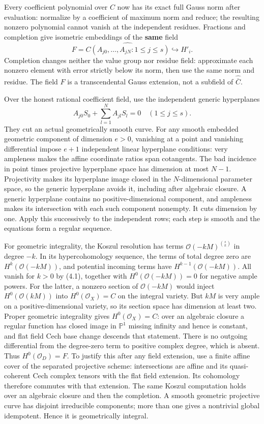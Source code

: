\documentclass[
  11pt,
]{article}
\begin{document}
Every coefficient polynomial over \(C\) now has its exact full Gauss
norm after evaluation: normalize by a coefficient of maximum norm and
reduce; the resulting nonzero polynomial cannot vanish at the
independent residues. Fractions and completion give isometric embeddings
of the \textbf{same} field \[
 F=\widehat{C(A_{j0},\ldots,A_{jN}:1\leq j\leq s)}
 \hookrightarrow H'_i. \tag{6.1}
\] Completion changes neither the value group nor residue field:
approximate each nonzero element with error strictly below its norm,
then use the same norm and residue. The field \(F\) is a transcendental
Gauss extension, not a subfield of \(\widehat{\overline C}\).

Over the honest rational coefficient field, use the independent generic
hyperplanes \[
 A_{j0}S_0+\sum_{l=1}^N A_{jl}S_l=0\quad(1\leq j\leq s).
 \tag{6.2}
\] They cut an actual geometrically smooth curve. For any smooth
embedded geometric component of dimension \(e>0\), vanishing at a point
and vanishing differential impose \(e+1\) independent linear hyperplane
conditions: very ampleness makes the affine coordinate ratios span
cotangents. The bad incidence in point times projective hyperplane space
has dimension at most \(N-1\). Projectivity makes its hyperplane image
closed in the \(N\)-dimensional parameter space, so the generic
hyperplane avoids it, including after algebraic closure. A generic
hyperplane contains no positive-dimensional component, and ampleness
makes its intersection with each such component nonempty. It cuts
dimension by one. Apply this successively to the independent rows; each
step is smooth and the equations form a regular sequence.

For geometric integrality, the Koszul resolution has terms
\(\mathcal O(-kM)^{\binom{s}{k}}\) in degree \(-k\). In its
hypercohomology sequence, the terms of total degree zero are
\(H^k(\mathcal O(-kM))\), and potential incoming terms have
\(H^{k-1}(\mathcal O(-kM))\). All vanish for \(k>0\) by (4.1), together
with \(H^0(\mathcal O(-kM))=0\) for negative ample powers. For the
latter, a nonzero section of \(\mathcal O(-kM)\) would inject
\(H^0(\mathcal O(kM))\) into \(H^0(\mathcal O_X)=C\) on the integral
variety. But \(kM\) is very ample on a positive-dimensional variety, so
its section space has dimension at least two. Proper geometric
integrality gives \(H^0(\mathcal O_X)=C\): over an algebraic closure a
regular function has closed image in \(\mathbb P^1\) missing infinity
and hence is constant, and flat field Cech base change descends that
statement. There is no outgoing differential from the degree-zero term
to positive complex degree, which is absent. Thus
\(H^0(\mathcal O_D)=F\). To justify this after any field extension, use
a finite affine cover of the separated projective scheme: intersections
are affine and its quasi-coherent Cech complex tensors with the flat
field extension. Its cohomology therefore commutes with that extension.
The same Koszul computation holds over an algebraic closure and then the
completion. A smooth geometric projective curve has disjoint irreducible
components; more than one gives a nontrivial global idempotent. Hence it
is geometrically integral.
\end{document}
